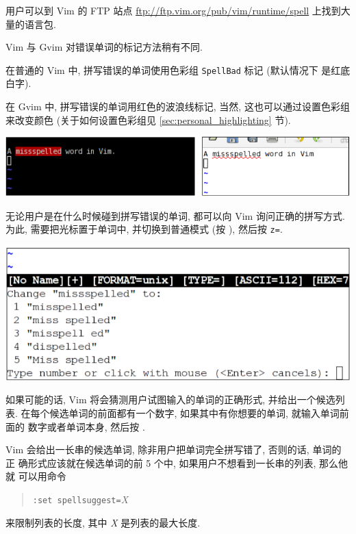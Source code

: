 \begin{warning}
    用户可以到 Vim 的 FTP 站点 \url{ftp://ftp.vim.org/pub/vim/runtime/spell}
    上找到大量的语言包.
\end{warning}

Vim 与 Gvim 对错误单词的标记方法稍有不同.

在普通的 Vim 中, 拼写错误的单词使用色彩组 \texttt{SpellBad} 标记 (默认情况下 
是红底白字).

在 Gvim 中, 拼写错误的单词用红色的波浪线标记, 当然, 这也可以通过设置色彩组
来改变颜色 (关于如何设置色彩组见 \ref{sec:personal_highlighting} 节).

\begin{center}
    \includegraphics[scale=0.5]{./images/page42-1.png}
\end{center}

无论用户是在什么时候碰到拼写错误的单词, 都可以向 Vim 询问正确的拼写方式.
为此, 需要把光标置于单词中, 并切换到普通模式 (按 ), 然后按
\texttt{z=}.

\begin{center}
    \includegraphics[scale=0.5]{./images/page42-2.png}
\end{center}

如果可能的话, Vim 将会猜测用户试图输入的单词的正确形式, 并给出一个候选列表.
在每个候选单词的前面都有一个数字, 如果其中有你想要的单词, 就输入单词前面的
数字或者单词本身, 然后按 .

Vim 会给出一长串的候选单词, 除非用户把单词完全拼写错了, 否则的话, 单词的正
确形式应该就在候选单词的前 5 个中, 如果用户不想看到一长串的列表, 那么他就
可以用命令
\begin{quotation}
    \texttt{:set spellsuggest=}\textit{X}
\end{quotation}
来限制列表的长度, 其中 \textit{X} 是列表的最大长度.
